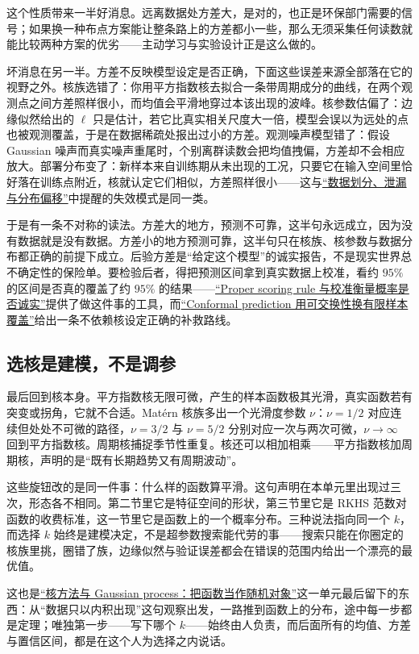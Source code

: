 这个性质带来一半好消息。远离数据处方差大，是对的，也正是环保部门需要的信号；如果换一种布点方案能让整条路上的方差都小一些，那么无须采集任何读数就能比较两种方案的优劣——主动学习与实验设计正是这么做的。

坏消息在另一半。方差不反映模型设定是否正确，下面这些误差来源全部落在它的视野之外。核族选错了：你用平方指数核去拟合一条带周期成分的曲线，在两个观测点之间方差照样很小，而均值会平滑地穿过本该出现的波峰。核参数估偏了：边缘似然给出的 \(\ell\) 只是估计，若它比真实相关尺度大一倍，模型会误以为远处的点也被观测覆盖，于是在数据稀疏处报出过小的方差。观测噪声模型错了：假设 Gaussian 噪声而真实噪声重尾时，个别离群读数会把均值拽偏，方差却不会相应放大。部署分布变了：新样本来自训练期从未出现的工况，只要它在输入空间里恰好落在训练点附近，核就认定它们相似，方差照样很小——这与\hyperref[sec:13-Machine-Learning/01-Learning-Problems-and-Evaluation/04]{``数据划分、泄漏与分布偏移''}中提醒的失效模式是同一类。

于是有一条不对称的读法。方差大的地方，预测不可靠，这半句永远成立，因为没有数据就是没有数据。方差小的地方预测可靠，这半句只在核族、核参数与数据分布都正确的前提下成立。后验方差是``给定这个模型''的诚实报告，不是现实世界总不确定性的保险单。要检验后者，得把预测区间拿到真实数据上校准，看约 \(95\%\) 的区间是否真的覆盖了约 \(95\%\) 的结果——\hyperref[sec:11-Mathematical-Statistics/07-Statistical-Decision-and-Reliable-Prediction/04]{``Proper scoring rule 与校准衡量概率是否诚实''}提供了做这件事的工具，而\hyperref[sec:11-Mathematical-Statistics/07-Statistical-Decision-and-Reliable-Prediction/05]{``Conformal prediction 用可交换性换有限样本覆盖''}给出一条不依赖核设定正确的补救路线。

\subsection{选核是建模，不是调参}

最后回到核本身。平方指数核无限可微，产生的样本函数极其光滑，真实函数若有突变或拐角，它就不合适。Matérn 核族多出一个光滑度参数 \(\nu\)：\(\nu=1/2\) 对应连续但处处不可微的路径，\(\nu=3/2\) 与 \(\nu=5/2\) 分别对应一次与两次可微，\(\nu\to\infty\) 回到平方指数核。周期核捕捉季节性重复。核还可以相加相乘——平方指数核加周期核，声明的是``既有长期趋势又有周期波动''。

这些旋钮改的是同一件事：什么样的函数算平滑。这句声明在本单元里出现过三次，形态各不相同。第二节里它是特征空间的形状，第三节里它是 RKHS 范数对函数的收费标准，这一节里它是函数上的一个概率分布。三种说法指向同一个 \(k\)，而选择 \(k\) 始终是建模决定，不是超参数搜索能代劳的事——搜索只能在你圈定的核族里挑，圈错了族，边缘似然与验证误差都会在错误的范围内给出一个漂亮的最优值。

这也是\hyperref[ch:117]{``核方法与 Gaussian process：把函数当作随机对象''}这一单元最后留下的东西：从``数据只以内积出现''这句观察出发，一路推到函数上的分布，途中每一步都是定理；唯独第一步——写下哪个 \(k\)——始终由人负责，而后面所有的均值、方差与置信区间，都是在这个人为选择之内说话。
